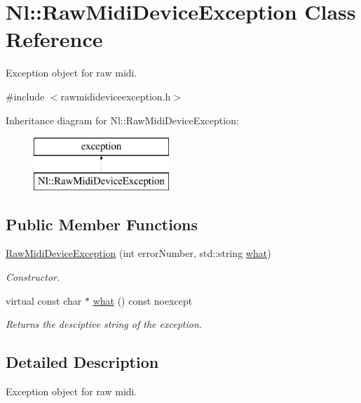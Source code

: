 \hypertarget{classNl_1_1RawMidiDeviceException}{\section{Nl\-:\-:Raw\-Midi\-Device\-Exception Class Reference}
\label{classNl_1_1RawMidiDeviceException}
}


Exception object for raw midi.  




{\ttfamily \#include $<$rawmidideviceexception.\-h$>$}

Inheritance diagram for Nl\-:\-:Raw\-Midi\-Device\-Exception\-:\begin{figure}[H]
\begin{center}
\leavevmode
\includegraphics[height=2.000000cm]{classNl_1_1RawMidiDeviceException}
\end{center}
\end{figure}
\subsection*{Public Member Functions}
\begin{DoxyCompactItemize}
\item 
\hyperlink{group__Midi_ga79b838431bf9ea9f8666684c38c036f7}{Raw\-Midi\-Device\-Exception} (int error\-Number, std\-::string \hyperlink{group__Midi_gaf6539bbb6e2285a3fa1b115e5b43fc13}{what})
\begin{DoxyCompactList}\small\item\em Constructor. \end{DoxyCompactList}\item 
virtual const char $\ast$ \hyperlink{group__Midi_gaf6539bbb6e2285a3fa1b115e5b43fc13}{what} () const noexcept
\begin{DoxyCompactList}\small\item\em Returns the desciptive string of the exception. \end{DoxyCompactList}\end{DoxyCompactItemize}


\subsection{Detailed Description}
Exception object for raw midi. 



